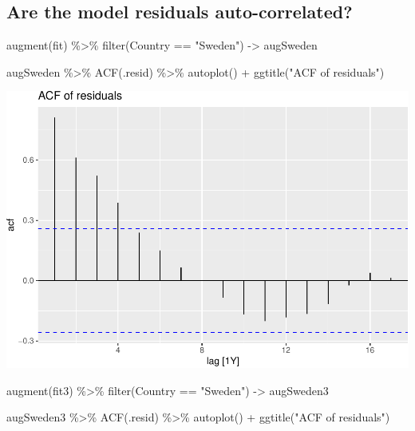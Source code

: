 \documentclass[
]{book}
\newenvironment{Shaded}{\begin{snugshade}}{\end{snugshade}}
\newcommand{\FunctionTok}[1]{\textcolor[rgb]{0.00,0.00,0.00}{#1}}
\newcommand{\NormalTok}[1]{#1}
\newcommand{\OtherTok}[1]{\textcolor[rgb]{0.56,0.35,0.01}{#1}}
\newcommand{\SpecialCharTok}[1]{\textcolor[rgb]{0.00,0.00,0.00}{#1}}
\newcommand{\StringTok}[1]{\textcolor[rgb]{0.31,0.60,0.02}{#1}}
\begin{document}
\hypertarget{are-the-model-residuals-auto-correlated}{%
\subsection{Are the model residuals auto-correlated?}\label{are-the-model-residuals-auto-correlated}}

\begin{Shaded}
\begin{Highlighting}[]
\FunctionTok{augment}\NormalTok{(fit) }\SpecialCharTok{\%\textgreater{}\%} \FunctionTok{filter}\NormalTok{(Country }\SpecialCharTok{==} \StringTok{"Sweden"}\NormalTok{) }\OtherTok{{-}\textgreater{}}\NormalTok{ augSweden}

\NormalTok{augSweden }\SpecialCharTok{\%\textgreater{}\%}
  \FunctionTok{ACF}\NormalTok{(.resid) }\SpecialCharTok{\%\textgreater{}\%}
  \FunctionTok{autoplot}\NormalTok{() }\SpecialCharTok{+} \FunctionTok{ggtitle}\NormalTok{(}\StringTok{"ACF of residuals"}\NormalTok{)}
\end{Highlighting}
\end{Shaded}

\includegraphics{graphics/unnamed-chunk-37-1.pdf}

\begin{Shaded}
\begin{Highlighting}[]
\FunctionTok{augment}\NormalTok{(fit3) }\SpecialCharTok{\%\textgreater{}\%} \FunctionTok{filter}\NormalTok{(Country }\SpecialCharTok{==} \StringTok{"Sweden"}\NormalTok{) }\OtherTok{{-}\textgreater{}}\NormalTok{ augSweden3}

\NormalTok{augSweden3 }\SpecialCharTok{\%\textgreater{}\%}
  \FunctionTok{ACF}\NormalTok{(.resid) }\SpecialCharTok{\%\textgreater{}\%}
  \FunctionTok{autoplot}\NormalTok{() }\SpecialCharTok{+} \FunctionTok{ggtitle}\NormalTok{(}\StringTok{"ACF of residuals"}\NormalTok{)}
\end{Highlighting}
\end{Shaded}
\end{document}
